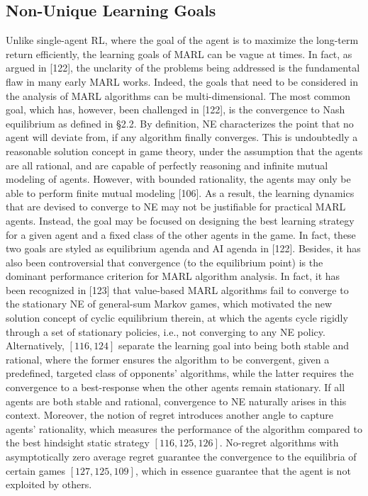 \documentclass[10pt]{article}
\begin{document}
\subsection{Non-Unique Learning Goals}
Unlike single-agent RL, where the goal of the agent is to maximize the long-term return efficiently, the learning goals of MARL can be vague at times. In fact, as argued in [122], the unclarity of the problems being addressed is the fundamental flaw in many early MARL works. Indeed, the goals that need to be considered in the analysis of MARL algorithms can be multi-dimensional. The most common goal, which has, however, been challenged in [122], is the convergence to Nash equilibrium as defined in §2.2. By definition, NE characterizes the point that no agent will deviate from, if any algorithm finally converges. This is undoubtedly a reasonable solution concept in game theory, under the assumption that the agents are all rational, and are capable of perfectly reasoning and infinite mutual modeling of agents. However, with bounded rationality, the agents may only be able to perform finite mutual modeling [106]. As a result, the learning dynamics that are devised to converge to NE may not be justifiable for practical MARL agents. Instead, the goal may be focused on designing the best learning strategy for a given agent and a fixed class of the other agents in the game. In fact, these two goals are styled as equilibrium agenda and AI agenda in [122]. Besides, it has also been controversial that convergence (to the equilibrium point) is the dominant performance criterion for MARL algorithm analysis. In fact, it has been recognized in [123] that value-based MARL algorithms fail to converge to the stationary NE of general-sum Markov games, which motivated the new solution concept of cyclic equilibrium therein, at which the agents cycle rigidly through a set of stationary policies, i.e., not converging to any NE policy. Alternatively, $[116,124]$ separate the learning goal into being both stable and rational, where the former ensures the algorithm to be convergent, given a predefined, targeted class of opponents' algorithms, while the latter requires the convergence to a best-response when the other agents remain stationary. If all agents are both stable and rational, convergence to NE naturally arises in this context. Moreover, the notion of regret introduces another angle to capture agents' rationality, which measures the performance of the algorithm compared to the best hindsight static strategy $[116,125,126]$. No-regret algorithms with asymptotically zero average regret guarantee the convergence to the equilibria of certain games $[127,125,109]$, which in essence guarantee that the agent is not exploited by others.
\end{document}
